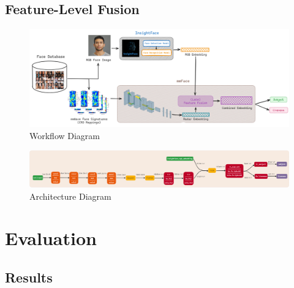 \documentclass{mpaper}
\begin{document}
\subsection{Feature-Level Fusion}


\begin{figure}[h!]
    \centering
    \includegraphics[width=1\textwidth]{figures/model_workflow.png}
    \caption{Workflow Diagram}
    \label{fig:model_workflow}
\end{figure}

\begin{figure}[h!]
    \centering
    \includegraphics[width=1\textwidth]{figures/model_architecture-test.png}
    \caption{Architecture Diagram}
    \label{fig:model_architecture}
\end{figure}


\section{Evaluation}

\subsection{Results}
    
\end{document}
